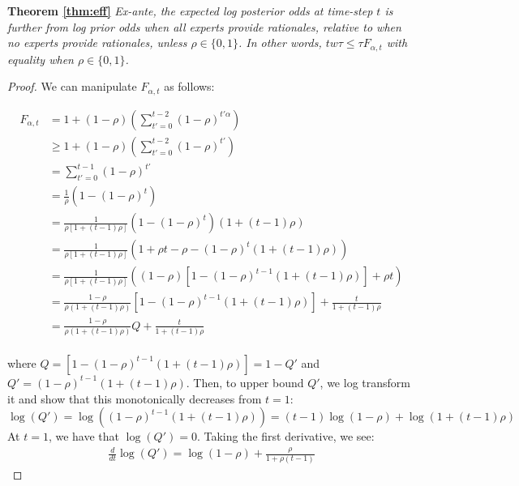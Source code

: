 \documentclass{winnower}
\begin{document}
\noindent\textbf{Theorem  \ref{thm:eff}}
    \emph{Ex-ante, the expected log posterior odds at time-step $t$ is further from log prior odds when all experts provide rationales, relative to when no experts provide rationales, unless $\rho \in \{0, 1\}$. In other words, $tw\tau \leq \tau F_{\alpha, t}$ with equality when $\rho \in \{0, 1\}$.}

\begin{proof}
 We can manipulate $F_{\alpha, t}$ as follows:

    \begin{equation}
    \begin{split}
        F_{\alpha, t} &= 1 + (1-\rho)\left(\sum_{t'=0}^{t-2} (1-\rho)^{t'\alpha}\right) \\
        &\geq 1 + (1-\rho)\left(\sum_{t'=0}^{t-2} (1-\rho)^{t'}\right) \\
        &= \sum_{t'=0}^{t-1} (1-\rho)^{t'} \\
        &= \frac{1}{\rho}(1 - (1-\rho)^t) \\
        &= \frac{1}{\rho\left[ 1+(t-1)\rho\right]}(1 - (1-\rho)^t)\left( 1+(t-1)\rho\right) \\
        &= \frac{1}{\rho\left[ 1+(t-1)\rho\right]}\left( 1 + \rho t - \rho - (1-\rho)^t\left( 1+(t-1)\rho\right) \right) \\
        &= \frac{1}{\rho\left[ 1+(t-1)\rho\right]}\left( (1-\rho)\left[1 - (1-\rho)^{t-1}(1 + (t-1)\rho)\right] +\rho t\right) \\
        &= \frac{1-\rho}{\rho\left( 1+(t-1)\rho\right)} \left[1 - (1-\rho)^{t-1}(1 + (t-1)\rho) \right] + \frac{t}{ 1+(t-1)\rho}\\
        &= \frac{ 1-\rho}{\rho\left( 1+(t-1)\rho\right)}Q  + \frac{t}{ 1+(t-1)\rho}\\
    \end{split}
    \end{equation}

where $Q = \left[1 - (1-\rho)^{t-1}(1 + (t-1)\rho)\right] = 1-Q'$ and $Q' = (1-\rho)^{t-1}(1 + (t-1)\rho)$. Then, to upper bound $Q'$, we log transform it and show that this monotonically decreases from $t=1$:
\begin{equation}
    \log(Q') = \log\left((1-\rho)^{t-1}(1 + (t-1)\rho)\right) = (t-1)\log(1-\rho) + \log(1 + (t-1)\rho)
\end{equation}
At $t=1$, we have that $\log(Q') = 0$. Taking the first derivative, we see:
\begin{equation}
    \begin{split}
        \frac{d}{dt} \log(Q') = \log(1-\rho) + \frac{\rho}{1+\rho(t-1)}
    \end{split}
\end{equation}


\end{proof}
\end{document}
